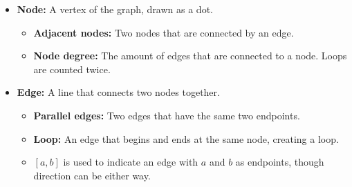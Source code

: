\documentclass[a4paper,12pt]{book}
\begin{document}
{\begin{introNOHEAD}{}
\begin{itemize}
                \item   \textbf{Node:} A vertex of the graph, drawn as a dot.
                    \begin{itemize}
                        \item   \textbf{Adjacent nodes:} Two nodes that are connected by an edge.
                        \item   \textbf{Node degree:} The amount of edges that are connected to a node.
                            Loops are counted twice.
                    \end{itemize}

                \item   \textbf{Edge:} A line that connects two nodes together.
                    \begin{itemize}
                        \item   \textbf{Parallel edges:} Two edges that have
                            the same two endpoints.
                        \item   \textbf{Loop:} An edge that begins and ends at
                            the same node, creating a loop.
                        \item   $[a, b]$ is used to indicate an edge with $a$ and $b$ as endpoints,
                            though direction can be either way.
                    \end{itemize}
            \end{itemize}
        \end{introNOHEAD}
        }{}

        \notonkey{ \newpage }{ \hrulefill }
\end{document}
